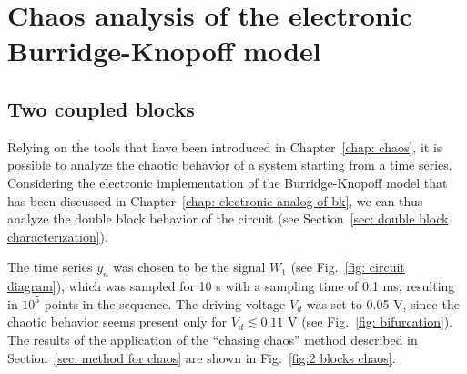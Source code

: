 \chapter{Chaos analysis of the electronic Burridge-Knopoff model}\label{chap: chaos analysis}


\section{Two coupled blocks}\label{sec: 2 blocks chaos}

Relying on the tools that have been introduced in Chapter~\ref{chap: chaos},
it is possible to analyze the chaotic behavior of a system starting from a time series.
Considering the electronic implementation of the Burridge-Knopoff model that has been discussed
in Chapter~\ref{chap: electronic analog of bk}, we can thus analyze the double block behavior
of the circuit (see Section~\ref{sec: double block characterization}).

The time series $y_n$ was chosen to be the signal $W_1$ (see Fig.~\ref{fig: circuit diagram}),
which was sampled for 10 s with a sampling time of 0.1 ms, resulting in $10^5$ points in the sequence.
The driving voltage $V_d$ was set to 0.05 V, since the chaotic behavior seems present only for
$V_d \lesssim 0.11$ V (see Fig.~\ref{fig: bifurcation}). The results of the application of the
``chasing chaos'' method described in Section~\ref{sec: method for chaos} are shown in Fig.~\ref{fig:2 blocks chaos}.

